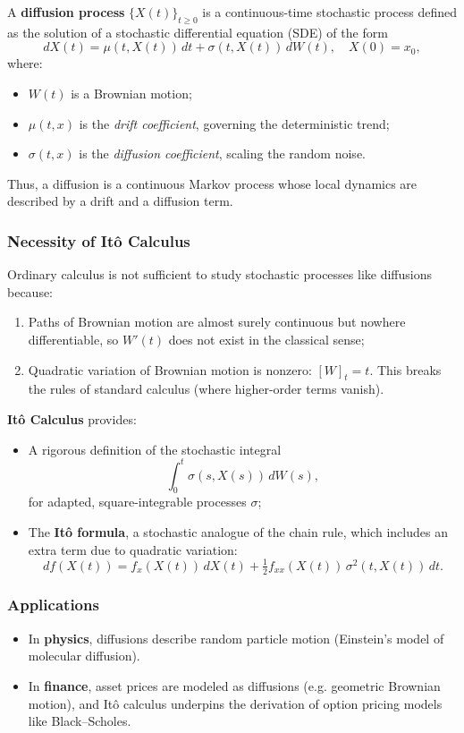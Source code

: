 \documentclass[12pt,a4paper]{book}
\theoremstyle{remark}
\begin{document}
A \textbf{diffusion process} $\{X(t)\}_{t\ge 0}$ is a continuous-time stochastic process defined as the solution of a stochastic differential equation (SDE) of the form
\[
dX(t) = \mu(t,X(t))\,dt + \sigma(t,X(t))\,dW(t), \quad X(0)=x_0,
\]
where:
\begin{itemize}
    \item $W(t)$ is a Brownian motion;
    \item $\mu(t,x)$ is the \emph{drift coefficient}, governing the deterministic trend;
    \item $\sigma(t,x)$ is the \emph{diffusion coefficient}, scaling the random noise.
\end{itemize}
Thus, a diffusion is a continuous Markov process whose local dynamics are described by a drift and a diffusion term.

\subsubsection*{Necessity of Itô Calculus}
Ordinary calculus is not sufficient to study stochastic processes like diffusions because:
\begin{enumerate}[label=\roman*)]
    \item Paths of Brownian motion are almost surely continuous but nowhere differentiable, so $W'(t)$ does not exist in the classical sense;
    \item Quadratic variation of Brownian motion is nonzero: $[W]_t = t$. This breaks the rules of standard calculus (where higher-order terms vanish).
\end{enumerate}

\textbf{Itô Calculus} provides:
\begin{itemize}
    \item A rigorous definition of the stochastic integral
    \[
    \int_0^t \sigma(s,X(s))\,dW(s),
    \]
    for adapted, square-integrable processes $\sigma$;
    \item The \textbf{Itô formula}, a stochastic analogue of the chain rule, which includes an extra term due to quadratic variation:
    \[
    df(X(t)) = f_x(X(t))\,dX(t) + \tfrac{1}{2} f_{xx}(X(t))\,\sigma^2(t,X(t))\,dt.
    \]
\end{itemize}

\subsubsection*{Applications}
\begin{itemize}
    \item In \textbf{physics}, diffusions describe random particle motion (Einstein’s model of molecular diffusion).
    \item In \textbf{finance}, asset prices are modeled as diffusions (e.g. geometric Brownian motion), and Itô calculus underpins the derivation of option pricing models like Black–Scholes.
\end{itemize}
\end{document}
